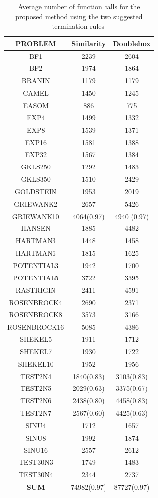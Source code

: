 \documentclass[journal,article,submit,pdftex,moreauthors]{Definitions/mdpi}
\begin{document}
\begin{table}[H]
\caption{ Average number of function calls for the proposed method using the two suggested termination rules.\label{tab:termination}}
\begin{center}
    \begin{tabular}{|c|c|c|}
    \toprule 
\textbf{PROBLEM
} & \textbf{Similarity} & 
\textbf{Doublebox}  \tabularnewline
\hline
BF1 & 2239 & 2604 \tabularnewline
\hline
BF2	& 1974 & 1864
\tabularnewline
\hline
BRANIN 	& 1179	& 1179\tabularnewline
\hline
CAMEL &	1450 & 1245 	\tabularnewline
\hline
EASOM &	886	&	775 
\tabularnewline
\hline
EXP4 	& 1499	& 1332		
\tabularnewline
\hline
EXP8 	& 1539 & 1371		
\tabularnewline
\hline
EXP16 &	1581	&1388	
\tabularnewline
\hline
EXP32 &	1567	& 1384 	
\tabularnewline
\hline
GKLS250 	&  1292	& 1483	
\tabularnewline
\hline
GKLS350 &	1510	& 2429	
\tabularnewline
\hline
GOLDSTEIN 	& 	1953 & 2019
\tabularnewline
\hline
GRIEWANK2 &	2657  &	5426
\tabularnewline
\hline
GRIEWANK10 &		4064(0.97) & 4940 (0.97)
\tabularnewline
\hline
HANSEN &	1885	& 4482
\tabularnewline
\hline
HARTMAN3 &	1448	 & 1458 
\tabularnewline
\hline
HARTMAN6 &	1815	&	1625
\tabularnewline
\hline
POTENTIAL3 	& 1942	&	1700 
\tabularnewline
\hline
POTENTIAL5 &		3722 & 3395	
\tabularnewline
\hline
RASTRIGIN &	2411 &	4591
\tabularnewline
\hline
ROSENBROCK4 &2690 &	 2371	
\tabularnewline
\hline
ROSENBROCK8 &	3573 &	3166
\tabularnewline
\hline
ROSENBROCK16 &	5085	&	4386
 \tabularnewline
\hline
SHEKEL5 &	1911 &	1712	
\tabularnewline
\hline
SHEKEL7 &		1930 &	1722	
\tabularnewline
\hline
SHEKEL10 &		1952 &	1956	
 \tabularnewline
\hline
TEST2N4 &	1840(0.83)	&	3103(0.83)
\tabularnewline
\hline
TEST2N5 &	2029(0.63) &	3375(0.67)
\tabularnewline
\hline
TEST2N6 &	2438(0.80)	&	4458(0.83)
\tabularnewline
\hline
TEST2N7	&  2567(0.60)	&	4425(0.63)
\tabularnewline
\hline
SINU4 &	1712 &	 1657 
\tabularnewline
\hline
SINU8 &	1992	&	1874 
\tabularnewline
\hline
SINU16 	& 2557	&	2612	
\tabularnewline
\hline
TEST30N3 	& 1749 &	 1483	
 \tabularnewline
\hline
TEST30N4  &	2344	&	2737
 \tabularnewline
\hline
\textbf{SUM}  &	74982(0.97)	&	87727(0.97)
\tabularnewline
\hline
\end{tabular}
\end{center}
\end{table}
\end{document}
